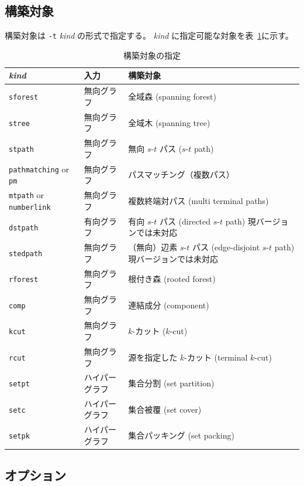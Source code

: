 \documentclass{jsarticle}
\begin{document}
\subsection{構築対象}

構築対象は \texttt{-t} \textit{kind} の形式で指定する。
\textit{kind} に指定可能な対象を表~\ref{tab:kind}に示す。

\begin{table}
\caption{構築対象の指定}
\label{tab:kind}
\begin{center}
\begin{tabular}[t]{|l|l|l|}
\hline
\textit{kind} & 入力 & 構築対象 \\ \hline \hline
\texttt{sforest} & 無向グラフ &全域森 (spanning forest) \\ \hline
\texttt{stree} & 無向グラフ & 全域木 (spanning tree) \\ \hline
\texttt{stpath} & 無向グラフ & 無向 $s$-$t$ パス ($s$-$t$ path) \\ \hline
\texttt{pathmatching} or \texttt{pm} & 無向グラフ & パスマッチング（複数パス） \\ \hline
\texttt{mtpath} or \texttt{numberlink} & 無向グラフ & 複数終端対パス (multi terminal paths) \\ \hline
\texttt{dstpath} & 有向グラフ & 有向 $s$-$t$ パス (directed $s$-$t$ path) 現バージョンでは未対応 \\ \hline
\texttt{stedpath} & 無向グラフ & （無向）辺素 $s$-$t$ パス (edge-disjoint $s$-$t$ path) 現バージョンでは未対応 \\ \hline
\texttt{rforest} & 無向グラフ & 根付き森 (rooted forest) \\ \hline
\texttt{comp} & 無向グラフ & 連結成分 (component) \\ \hline
\texttt{kcut} & 無向グラフ & $k$-カット ($k$-cut) \\ \hline
\texttt{rcut} & 無向グラフ & 源を指定した $k$-カット (terminal $k$-cut) \\ \hline
\texttt{setpt} & ハイパーグラフ & 集合分割 (set partition) \\ \hline
\texttt{setc} & ハイパーグラフ & 集合被覆 (set cover) \\ \hline
\texttt{setpk} & ハイパーグラフ & 集合パッキング (set packing) \\
\hline
\end{tabular}
\end{center}
\end{table}

\subsection{オプション}
\end{document}
